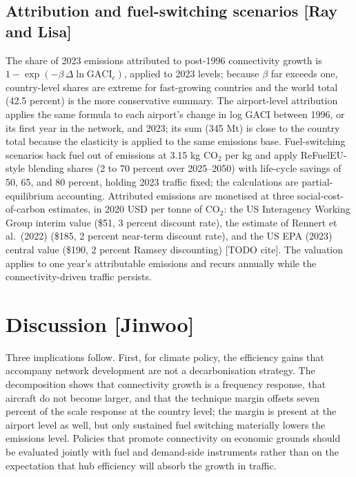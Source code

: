 \documentclass[12pt]{article}
\begin{document}
\subsection*{Attribution and fuel-switching scenarios [Ray and Lisa]}
The share of 2023 emissions attributed to post-1996 connectivity growth is
$1 - \exp(-\beta\,\Delta \ln \mathrm{GACI}_c)$, applied to 2023 levels;
because $\beta$ far exceeds one, country-level shares are extreme for
fast-growing countries and the world total (42.5 percent) is the more
conservative summary. The airport-level attribution applies the same
formula to each airport's change in log GACI between 1996, or its first
year in the network, and 2023; its sum (345 Mt) is close to the country
total because the elasticity is applied to the same emissions base. Fuel-switching scenarios back fuel out of emissions
at 3.15 kg CO$_2$ per kg and apply ReFuelEU-style blending shares (2 to 70
percent over 2025--2050) with life-cycle savings of 50, 65, and 80 percent,
holding 2023 traffic fixed; the calculations are partial-equilibrium
accounting. Attributed emissions are monetised at three
social-cost-of-carbon estimates, in 2020 USD per tonne of CO$_2$: the US
Interagency Working Group interim value (\$51, 3 percent discount rate),
the estimate of Rennert et al.\ (2022) (\$185, 2 percent near-term
discount rate), and the US EPA (2023) central value (\$190, 2 percent
Ramsey discounting) [TODO cite]. The valuation applies to one year's
attributable emissions and recurs annually while the connectivity-driven
traffic persists.

\section*{Discussion [Jinwoo]}
Three implications follow. First, for climate policy, the efficiency gains
that accompany network development are not a decarbonisation strategy. The
decomposition shows that connectivity growth is a frequency response, that
aircraft do not become larger, and that the technique margin offsets seven
percent of the scale response at the country level; the margin is present
at the airport level as well, but only sustained fuel switching materially
lowers the emissions level. Policies that promote connectivity on economic
grounds should be evaluated jointly with fuel and demand-side instruments
rather than on the expectation that hub efficiency will absorb the growth
in traffic.
\end{document}
